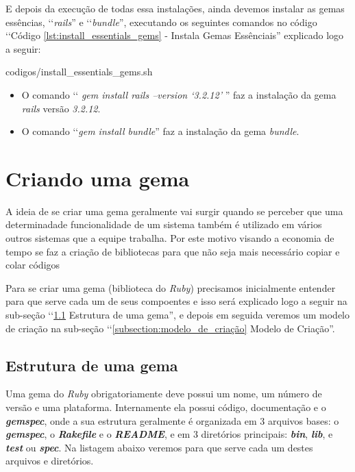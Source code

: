 E depois da execução de todas essa instalações, ainda devemos instalar as gemas essências, ‘‘\emph{rails}'' 
e ‘‘\emph{bundle}'', executando os seguintes comandos no código 
‘‘Código \ref{lst:install_essentials_gems} - Instala Gemas Essênciais'' explicado logo a seguir:
 

{codigos/install_essentials_gems.sh}

\begin{itemize}

 \item O comando ‘‘ \emph{gem install rails --version ‘3.2.12'} '' faz a instalação da gema \emph{rails}
 versão \emph{3.2.12}.
 
 \item O comando ‘‘\emph{gem install bundle}'' faz a instalação da gema \emph{bundle}.
 
\end{itemize}


\section{Criando uma gema}
\label{section:criando_uma_gema}

A ideia de se criar uma gema geralmente vai surgir quando se perceber que uma determinadade funcionalidade de
um sistema também é utilizado em vários outros sistemas que a equipe trabalha. Por este motivo visando a economia
de tempo se faz a criação de bibliotecas para que não seja mais necessário copiar e colar códigos 

Para se criar uma gema (biblioteca do \emph{Ruby}) precisamos inicialmente entender para que serve cada um
de seus compoentes e isso será explicado logo a seguir na sub-seção 
‘‘\ref{subsec:estrutura_de_uma_gema} Estrutura de uma gema'', e depois em seguida veremos um modelo de criação 
na sub-seção ‘‘\ref{subsection:modelo_de_criação} Modelo de Criação''.

\subsection{Estrutura de uma gema}
\label{subsec:estrutura_de_uma_gema}

Uma gema do \emph{Ruby} obrigatoriamente deve possui um nome, um número de versão e uma plataforma.
Internamente ela possui código, documentação e o \emph{\textbf{gemspec}}, onde a sua estrutura geralmente é 
organizada em 3 arquivos bases: o \emph{\textbf{gemspec}}, o \emph{\textbf{Rakefile}} e o 
\emph{\textbf{README}}, e em 3 diretórios principais: \emph{\textbf{bin}}, \emph{\textbf{lib}}, e 
\emph{\textbf{test}} ou \emph{\textbf{spec}}. Na listagem abaixo veremos para que serve cada um destes
arquivos e diretórios.


